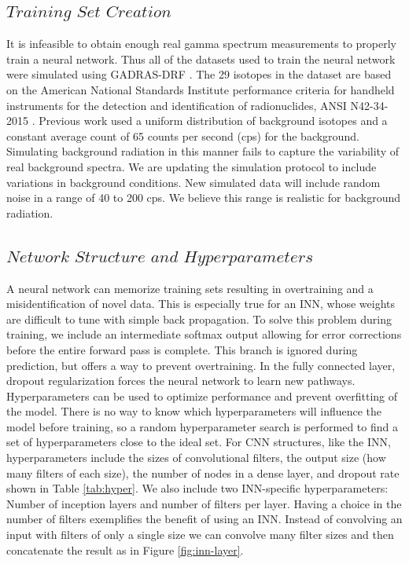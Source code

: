 \documentclass[fleqn]{anstrans}
\begin{document}
\subsection{$\textit{Training Set Creation}$}
It is infeasible to obtain enough real gamma spectrum measurements to properly train a neural network. 
Thus all of the datasets used to train the neural network were simulated using GADRAS-DRF \cite{mitchellGADRASIsotopeID2014}. 
The 29 isotopes in the dataset are based on the American National Standards Institute performance criteria for handheld instruments for the detection and identification of radionuclides, ANSI N42-34-2015 \cite{AmericanNationalStandard2016}. 
Previous work \cite{kamudaComparisonMachineLearning2018a} used a uniform distribution of background isotopes and a constant average count of 65 counts per second (cps) for the background. 
Simulating background radiation in this manner fails to capture the variability of real background spectra.
We are updating the simulation protocol to include variations in background conditions. New simulated data will include random noise in a range of 40 to 200 cps. 
We believe this range is realistic for background radiation.

\subsection{$\textit{Network Structure and Hyperparameters}$}
A neural network can memorize training sets resulting in overtraining and a misidentification of novel data. 
This is especially true for an INN, whose weights are difficult to tune with simple back propagation.
To solve this problem during training, we include an intermediate softmax output allowing for error corrections before the entire forward pass is complete. 
This branch is ignored during prediction, but offers a way to prevent overtraining. 
In the fully connected layer, dropout regularization forces the neural network to learn new pathways. 
Hyperparameters can be used to optimize performance and prevent overfitting of the model.
There is no way to know which hyperparameters will influence the model before training, so a random hyperparameter search is performed to find a set of hyperparameters close to the ideal set\cite{bergstraRandomSearchHyperParameter}. 
For CNN structures, like the INN, hyperparameters include the sizes of convolutional filters, the output size (how many filters of each size), the number of nodes in a dense layer, and dropout rate \cite{kamudaMachineLearningApproach2018} shown in Table \ref{tab:hyper}. We also include two INN-specific hyperparameters: Number of inception layers and number of filters per layer. Having a choice in the number of filters exemplifies the benefit of using an INN. Instead of convolving an input with filters of only a single size we can convolve many filter sizes and then concatenate the result as in Figure \ref{fig:inn-layer}.
\end{document}
